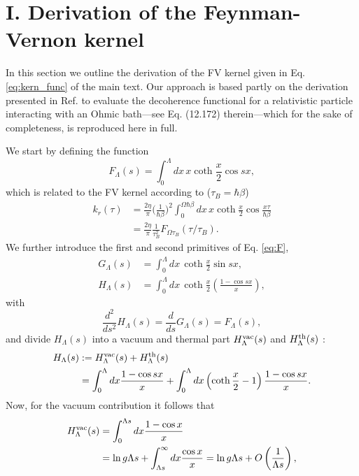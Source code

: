 \documentclass[prl,twocolumn,superscriptaddress,amsmath,amssymb]{revtex4-2}
\def\be{\begin{equation}}
\def\ee{\end{equation}}
\newcommand{\hb}{\hbar}
\begin{document}
\renewcommand{\thesection}{\Roman{section}}
\renewcommand{\thesubsection}{\Alph{subsection}}


\section{I. Derivation of the Feynman-Vernon kernel}

In this section we outline the derivation of the FV kernel given in Eq. \eqref{eq:kern_func} of the main text. Our approach is based partly on the derivation presented in Ref. \cite{BP2002} to evaluate the decoherence functional for a relativistic particle interacting with an Ohmic bath---see Eq. (12.172) therein---which for the sake of completeness, is reproduced here in full. 

We start by defining the function 
\be\label{eq:F}
    F_{\Lambda}(s) = \int^{\Lambda}_0dx\,x\coth\frac{x}{2}\cos{sx},
\ee
which is related to the FV kernel according to ($\tau_B = \hb\beta$)
\begin{align}\label{eq:fv_kern}
	k_r(\tau) &= \frac{2\eta}{\pi}\Big(\frac{1}{\hb\beta}\Big)^2\int^{\Omega\hb\beta}_0dx\,x\coth\frac{x}{2}\cos\frac{x\tau}{\hb\beta} \nonumber\\
		 &= \frac{2\eta}{\pi}\frac{1}{\tau_B^2} F_{\Omega\tau_B}(\tau/\tau_B).
\end{align}
We further introduce the first and second primitives of Eq. \eqref{eq:F}, 
\begin{align}
	G_{\Lambda}(s) &= \int^{\Lambda}_0dx\,\coth\frac{x}{2}\sin sx, \\
	H_{\Lambda}(s) &= \int^{\Lambda}_0dx\,\coth\frac{x}{2}\left(\frac{1-\cos sx}{x}\right),
\end{align}
with 
\be\label{eq:primatives}
	\frac{d^2}{ds^2}H_{\Lambda}(s) = \frac{d}{ds}G_{\Lambda}(s) = F_{\Lambda}(s),
\ee
and divide $H_{\Lambda}(s)$ into a vacuum and thermal part $H^{\rm vac}_{\Lambda}(s)$ and $H^{\rm th}_{\Lambda}(s)$ \cite{BP2002}:
\begin{align}
	H_{\Lambda}(s) &:= H^{\rm vac}_{\Lambda}(s) + H^{\rm th}_{\Lambda}(s) \nonumber\\
    &= \int^{\Lambda}_0dx\frac{1-\cos sx}{x} + \int^{\Lambda}_0dx\left(\coth\frac{x}{2}-1\right)\frac{1-\cos sx}{x}.
\end{align}
Now, for the vacuum contribution it follows that
\begin{align}\label{eq:H_vac}
	H^{\rm vac}_{\Lambda}(s) &= \int^{\Lambda s}_0dx\frac{1-\cos x}{x} \nonumber\\
					  &= {\rm ln}\,g\Lambda s + \int^{\infty}_{\Lambda s}dx\frac{\cos x}{x} = {\rm ln}\,g\Lambda s + O\left(\frac{1}{\Lambda s}\right),
\end{align}
\end{document}

